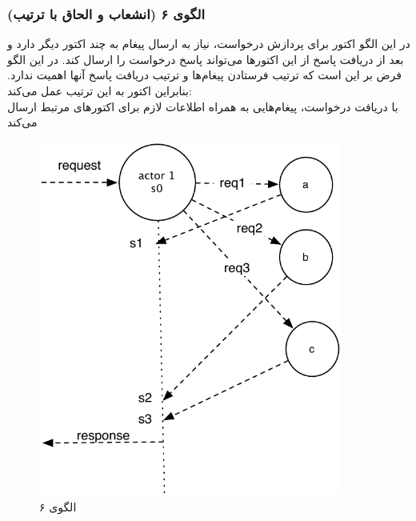\subsubsection{الگوی ۶ (انشعاب و الحاق با ترتیب)}
در این الگو اکتور برای پردازش درخواست، نیاز به ارسال پیغام به چند اکتور دیگر دارد و بعد از دریافت پاسخ از این اکتورها می‌تواند پاسخ درخواست را ارسال کند. در این الگو فرض بر این است که ترتیب فرستادن پیغام‌ها و ترتیب دریافت پاسخ‌ آنها اهمیت ندارد. بنابراین اکتور به این ترتیب عمل می‌کند:\\
با دریافت درخواست، پیغام‌هایی به همراه اطلاعات لازم برای اکتورهای مرتبط ارسال می‌کند
\begin{figure}[hb]
    \begin{center}
	\includegraphics[width=10cm]{4-ProposedFramework/Figures/Patterns_statelfull_fj_sequenced_receive.pdf}
    \end{center}
    \caption{\label{fig:Patterns_statefull_6}الگوی ۶}
\end{figure}


